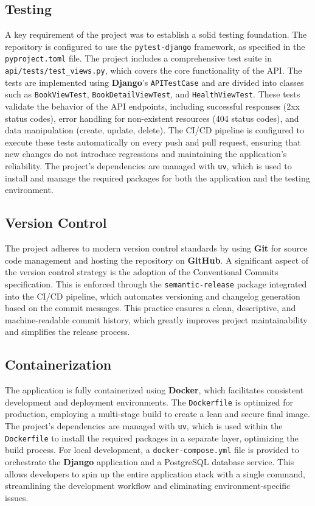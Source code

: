 \documentclass{article}
\begin{document}
\subsection{Testing}

A key requirement of the project was to establish a solid testing foundation. The repository is configured to use the \texttt{pytest-django} framework, as specified in the \texttt{pyproject.toml} file. The project includes a comprehensive test suite in \texttt{api/tests/test_views.py}, which covers the core functionality of the API. The tests are implemented using \textbf{Django}'s \texttt{APITestCase} and are divided into classes such as \texttt{BookViewTest}, \texttt{BookDetailViewTest}, and \texttt{HealthViewTest}. These tests validate the behavior of the API endpoints, including successful responses (2xx status codes), error handling for non-existent resources (404 status codes), and data manipulation (create, update, delete). The CI/CD pipeline is configured to execute these tests automatically on every push and pull request, ensuring that new changes do not introduce regressions and maintaining the application's reliability. The project's dependencies are managed with \texttt{uv}, which is used to install and manage the required packages for both the application and the testing environment.

\subsection{Version Control}

The project adheres to modern version control standards by using \textbf{Git} for source code management and hosting the repository on \textbf{GitHub}. A significant aspect of the version control strategy is the adoption of the Conventional Commits specification. This is enforced through the \texttt{semantic-release} package integrated into the CI/CD pipeline, which automates versioning and changelog generation based on the commit messages. This practice ensures a clean, descriptive, and machine-readable commit history, which greatly improves project maintainability and simplifies the release process.

\subsection{Containerization}

The application is fully containerized using \textbf{Docker}, which facilitates consistent development and deployment environments. The \texttt{Dockerfile} is optimized for production, employing a multi-stage build to create a lean and secure final image. The project's dependencies are managed with \texttt{uv}, which is used within the \texttt{Dockerfile} to install the required packages in a separate layer, optimizing the build process. For local development, a \texttt{docker-compose.yml} file is provided to orchestrate the \textbf{Django} application and a PostgreSQL database service. This allows developers to spin up the entire application stack with a single command, streamlining the development workflow and eliminating environment-specific issues.
\end{document}
